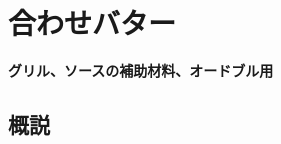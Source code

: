 \href{未、原文対照チェック}{} \href{未、日本語表現校正}{}
\href{未、その他修正}{} \href{未、原稿最終校正}{}

\hypertarget{beurres-composes}{%
\section{合わせバター}\label{beurres-composes}}

\vspace{-1\zw}
\begin{center}
\textbf{グリル、ソースの補助材料、オードブル用}
\end{center}
\vspace{1\zw}


 

\hypertarget{observation-sur-les-beurres-composes}{%
\subsection{概説}\label{observation-sur-les-beurres-composes}}

